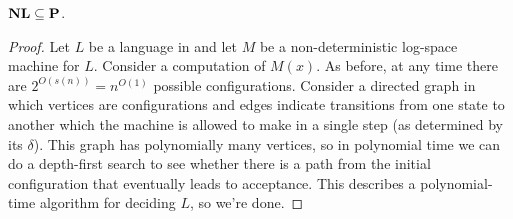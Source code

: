 \begin{Thm}
$\nl \subseteq \p$.
\end{Thm}
\begin{proof}
Let $L$ be a language in \nl{} and let $M$ be a non-deterministic
log-space machine for $L$.  Consider a computation of $M(x)$.  As before,
at any time there are $2^{O(s(n))} = n^{O(1)}$ possible configurations.
Consider a directed graph in which vertices are configurations and
edges indicate transitions from one state to another which the machine
is allowed to make in a single step (as determined by its $\delta$).
This graph has polynomially many vertices, so in polynomial time
we can do a depth-first search to see whether there is a path from
the initial configuration that eventually leads to acceptance.  This
describes a polynomial-time algorithm for deciding $L$, so we're done.
\end{proof}

